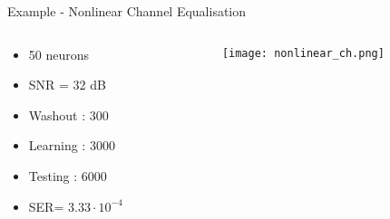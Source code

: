 \begin{frame}{Example - Nonlinear Channel Equalisation}

	\begin{columns} %
	\begin{column}{.33\textwidth}
	
		\begin{itemize}
			\item 50 neurons
			\item SNR = 32 dB
			\item Washout : 300
			\item Learning : 3000
			\item Testing : 6000
			\item SER= $3.33 \cdot 10^{-4}$
		\end{itemize}
		
	\end{column}%
	\hfill%
	\begin{column}{.63\textwidth}
	\begin{figure}
		\texttt{[image: nonlinear\_ch.png]}
	\end{figure}

	\end{column}%
	\end{columns}
	
\end{frame}
